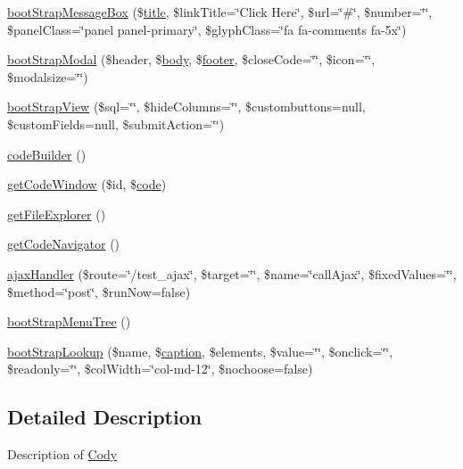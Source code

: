 \begin{DoxyCompactItemize}
\item 
\hyperlink{classCody_a5eaecf702f81ad0cee70cad3a7f9bcfa}{boot\+Strap\+Message\+Box} (\$\hyperlink{Shape_8php_ad264ad0cabbe965bf7f7c8a5ed6abebb}{title}, \$link\+Title=\char`\"{}Click Here\char`\"{}, \$url=\char`\"{}\#\char`\"{}, \$number=\char`\"{}\char`\"{}, \$panel\+Class=\char`\"{}panel panel-\/primary\char`\"{}, \$glyph\+Class=\char`\"{}fa fa-\/comments fa-\/5x\char`\"{})
\item 
\hyperlink{classCody_a7f214a9c8f38f3f72b6209bbfa18b757}{boot\+Strap\+Modal} (\$header, \$\hyperlink{Shape_8php_a88c61c5f59a3f950b502f07325de2f87}{body}, \$\hyperlink{Shape_8php_ae5058e5b790e8cea2dd33c1c9bbcbbd4}{footer}, \$close\+Code=\char`\"{}\char`\"{}, \$icon=\char`\"{}\char`\"{}, \$modalsize=\char`\"{}\char`\"{})
\item 
\hyperlink{classCody_a8518bcc95441b4c3e7fbae070c0402fb}{boot\+Strap\+View} (\$sql=\char`\"{}\char`\"{}, \$hide\+Columns=\char`\"{}\char`\"{}, \$custombuttons=null, \$custom\+Fields=null, \$submit\+Action=\char`\"{}\char`\"{})
\item 
\hyperlink{classCody_a993ccef820ff205c9a96511a473ff9f7}{code\+Builder} ()
\item 
\hyperlink{classCody_a4b33bd3c589058703a35914506890293}{get\+Code\+Window} (\$id, \$\hyperlink{Shape_8php_ab09356b52e00cf46f1ee5be7344c9139}{code})
\item 
\hyperlink{classCody_a5737b5a18b58d98dc4a6f8ebc9053d3b}{get\+File\+Explorer} ()
\item 
\hyperlink{classCody_aba8685265ba1d7dc8bae6250242a7956}{get\+Code\+Navigator} ()
\item 
\hyperlink{classCody_a575c69bd5fe37c9d6e08016e109ab0ee}{ajax\+Handler} (\$route=\char`\"{}/test\+\_\+ajax\char`\"{}, \$target=\char`\"{}\char`\"{}, \$name=\char`\"{}call\+Ajax\char`\"{}, \$fixed\+Values=\char`\"{}\char`\"{}, \$method=\char`\"{}post\char`\"{}, \$run\+Now=false)
\item 
\hyperlink{classCody_a7ce9d2ec93f884278cac8f406b849a11}{boot\+Strap\+Menu\+Tree} ()
\item 
\hyperlink{classCody_a877f34e4ebb7e75f2f12252a98fad5d2}{boot\+Strap\+Lookup} (\$name, \$\hyperlink{Shape_8php_af310fcd32ca64d696b944cf99bf602ff}{caption}, \$elements, \$value=\char`\"{}\char`\"{}, \$onclick=\char`\"{}\char`\"{}, \$readonly=\char`\"{}\char`\"{}, \$col\+Width=\char`\"{}col-\/md-\/12\char`\"{}, \$nochoose=false)
\end{DoxyCompactItemize}


\subsection{Detailed Description}
Description of \hyperlink{classCody}{Cody}

